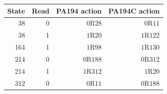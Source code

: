 \begin{center}
\begin{tabular}{@{}rrrr@{}}
\toprule
State & Read & PA194 action & PA194C action \\
\midrule
38 & 0 & $0\mathrm{R}28$ & $0\mathrm{R}11$ \\
38 & 1 & $1\mathrm{R}20$ & $1\mathrm{R}122$ \\
164 & 1 & $1\mathrm{R}98$ & $1\mathrm{R}130$ \\
214 & 0 & $0\mathrm{R}188$ & $0\mathrm{R}312$ \\
214 & 1 & $1\mathrm{R}312$ & $1\mathrm{R}20$ \\
312 & 0 & $0\mathrm{R}11$ & $0\mathrm{R}188$ \\
\bottomrule
\end{tabular}
\end{center}
